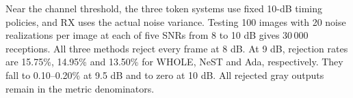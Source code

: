 Near the channel threshold, the three token systems use fixed 10-dB timing policies, and RX uses the actual noise variance. Testing 100 images with 20 noise realizations per image at each of five SNRs from 8 to 10 dB gives 30\,000 receptions. All three methods reject every frame at 8 dB. At 9 dB, rejection rates are 15.75\%, 14.95\% and 13.50\% for WHOLE, NeST and Ada, respectively. They fall to 0.10--0.20\% at 9.5 dB and to zero at 10 dB. All rejected gray outputs remain in the metric denominators.
